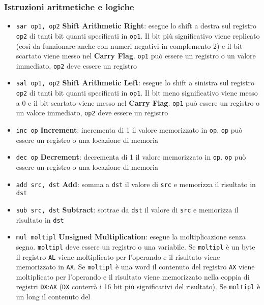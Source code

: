 \documentclass[a4paper]{article}
\theoremstyle{break}
\theoremstyle{break}
\theoremstyle{break}
\theoremstyle{break}
\begin{document}
\subsubsection{Istruzioni aritmetiche e logiche}
\begin{itemize}
  \item \texttt{sar op1, op2} \quad \textbf{Shift Arithmetic Right}: esegue lo shift a destra sul
    registro \texttt{op2} di tanti bit quanti specificati in \texttt{op1}. Il bit
    più significativo viene replicato (così da funzionare anche
    con numeri negativi in complemento 2) e il bit scartato
    viene messo nel \textbf{Carry Flag}. \texttt{op1} può essere un registro
    o un valore immediato, \texttt{op2} deve essere un registro 
  \item \texttt{sal op1, op2} \quad \textbf{Shift Arithmetic Left}: esegue lo shift a sinistra sul
    registro \texttt{op2} di tanti bit quanti specificati in \texttt{op1}. Il bit
    meno significativo viene messo a \( 0 \)  e il bit scartato viene
    messo nel \textbf{Carry Flag}. \texttt{op1} può essere un registro o un
    valore immediato, \texttt{op2} deve essere un registro 
  \item \texttt{inc op} \quad \textbf{Increment}: incrementa di 1 il valore memorizzato in 
    \texttt{op}. \texttt{op} può essere un registro o una locazione di memoria 
  \item \texttt{dec op} \quad \textbf{Decrement}: decrementa di 1 il valore memorizzato in
    \texttt{op}. \texttt{op} può essere un registro o una locazione di
    memoria 
  \item \texttt{add src, dst} \quad \textbf{Add}: somma a \texttt{dst} il valore di \texttt{src} 
    e memorizza il risultato in \texttt{dst} 
  \item \texttt{sub src, dst} \quad \textbf{Subtract}: sottrae da \texttt{dst} il valore di \texttt{src} 
    e memorizza il risultato in \texttt{dst}
  \item \texttt{mul moltipl} \quad \textbf{Unsigned Multiplication}: esegue la moltiplicazione
    senza segno. \texttt{moltipl} deve essere un registro o una
    variabile. Se \texttt{moltipl} è un byte il registro \texttt{AL} viene
    moltiplicato per l'operando e il risultato viene
    memorizzato in \texttt{AX}. Se \texttt{moltipl} è una word il
    contenuto del registro \texttt{AX} viene moltiplicato per
    l'operando e il risultato viene memorizzato nella coppia
    di registri \texttt{DX}:\texttt{AX} (\texttt{DX} conterrà i 16 bit più significativi
    del risultato). Se \texttt{moltipl} è un long il contenuto del

\end{itemize}
\end{document}

